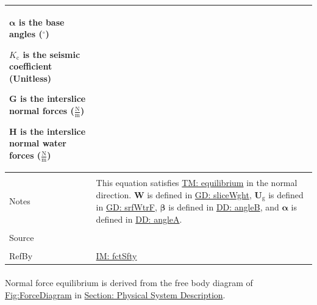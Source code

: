 \documentclass[12pt]{article}
\begin{document}
\begin{minipage}{\textwidth}
\begin{tabular}{>{\raggedright}p{}>{\raggedright\arraybackslash}p{}}
\begin{symbDescription}
              \item{$\mathbf{α}$ is the base angles (${}^{\circ}$)}
              \item{${K_{\text{c}}}$ is the seismic coefficient (Unitless)}
              \item{$\mathbf{G}$ is the interslice normal forces ($\frac{\text{N}}{\text{m}}$)}
              \item{$\mathbf{H}$ is the interslice normal water forces ($\frac{\text{N}}{\text{m}}$)}
              \end{symbDescription}
\\ \midrule \\
Notes & This equation satisfies \hyperref[TM:equilibrium]{TM: equilibrium} in the normal direction. $\mathbf{W}$ is defined in \hyperref[GD:sliceWght]{GD: sliceWght}, ${\mathbf{U}_{\text{g}}}$ is defined in \hyperref[GD:srfWtrF]{GD: srfWtrF}, $\mathbf{β}$ is defined in \hyperref[DD:angleB]{DD: angleB}, and $\mathbf{α}$ is defined in \hyperref[DD:angleA]{DD: angleA}.
        
\\ \midrule \\
Source & \cite{chen2005}
         
\\ \midrule \\
RefBy & \hyperref[IM:fctSfty]{IM: fctSfty}
        
\\ \bottomrule
\end{tabular}
\end{minipage}
\paragraph{}
\label{GD:normForcEqDeriv}
Normal force equilibrium is derived from the free body diagram of \hyperref[Figure:ForceDiagram]{Fig:ForceDiagram} in \hyperref[Sec:PhysSyst]{Section: Physical System Description}.
\end{document}
